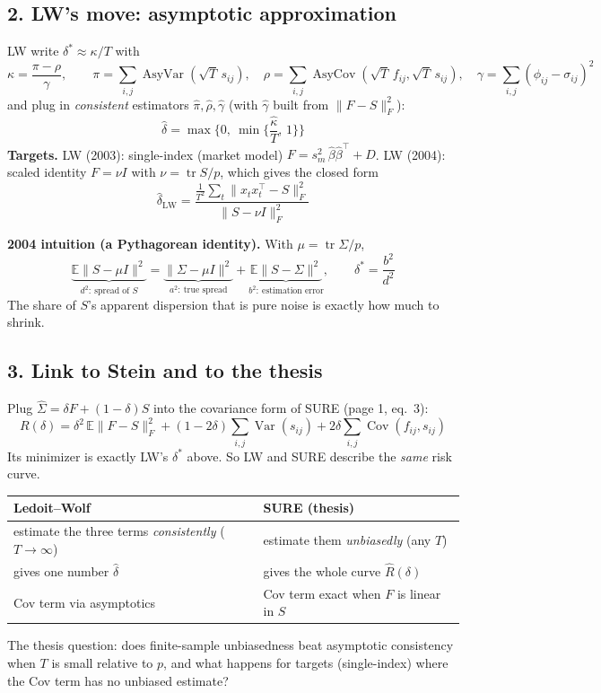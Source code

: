 \documentclass[12pt]{article}
\begin{document}
\subsection*{2. LW's move: asymptotic approximation}
LW write $\delta^* \approx \kappa/T$ with
\[
\kappa = \frac{\pi - \rho}{\gamma}, \qquad
\pi = \sum_{i,j}\operatorname{AsyVar}(\sqrt T\, s_{ij}),\quad
\rho = \sum_{i,j}\operatorname{AsyCov}(\sqrt T\, f_{ij},\sqrt T\, s_{ij}),\quad
\gamma = \sum_{i,j}(\phi_{ij}-\sigma_{ij})^2
\]
and plug in \emph{consistent} estimators $\hat\pi,\hat\rho,\hat\gamma$ (with $\hat\gamma$ built from $\|F-S\|_F^2$):
\[
\hat\delta = \max\!\Big\{0,\ \min\!\Big\{\frac{\hat\kappa}{T},\,1\Big\}\Big\}
\]
\textbf{Targets.} LW (2003): single-index (market model) $F = s_m^2\,\hat\beta\hat\beta^\top + D$.
LW (2004): scaled identity $F=\nu I$ with $\nu=\operatorname{tr}S/p$, which gives the closed form
\[
\hat\delta_{\text{LW}} = \frac{\frac{1}{T^2}\sum_{t}\|x_tx_t^\top - S\|_F^2}{\|S-\nu I\|_F^2}
\]

\textbf{2004 intuition (a Pythagorean identity).} With $\mu = \operatorname{tr}\Sigma/p$,
\[
\underbrace{\mathbb{E}\|S-\mu I\|^2}_{d^2:\ \text{spread of } S}
= \underbrace{\|\Sigma-\mu I\|^2}_{a^2:\ \text{true spread}}
+ \underbrace{\mathbb{E}\|S-\Sigma\|^2}_{b^2:\ \text{estimation error}},
\qquad \delta^* = \frac{b^2}{d^2}
\]
The share of $S$'s apparent dispersion that is pure noise is exactly how much to shrink.

\subsection*{3. Link to Stein and to the thesis}
Plug $\hat\Sigma=\delta F+(1-\delta)S$ into the covariance form of SURE (page 1, eq.~3):
\[
R(\delta) = \delta^2\,\mathbb{E}\|F-S\|_F^2 + (1-2\delta)\sum_{i,j}\operatorname{Var}(s_{ij}) + 2\delta\sum_{i,j}\operatorname{Cov}(f_{ij},s_{ij})
\]
Its minimizer is exactly LW's $\delta^*$ above. So LW and SURE describe the \emph{same} risk curve.
\begin{center}
\begin{tabular}{l|l}
\textbf{Ledoit--Wolf} & \textbf{SURE (thesis)}\\\hline
estimate the three terms \emph{consistently} ($T\to\infty$) & estimate them \emph{unbiasedly} (any $T$)\\
gives one number $\hat\delta$ & gives the whole curve $\widehat R(\delta)$\\
Cov term via asymptotics & Cov term exact when $F$ is linear in $S$
\end{tabular}
\end{center}
The thesis question: does finite-sample unbiasedness beat asymptotic consistency when $T$ is small
relative to $p$, and what happens for targets (single-index) where the Cov term has no unbiased estimate?
\end{document}
